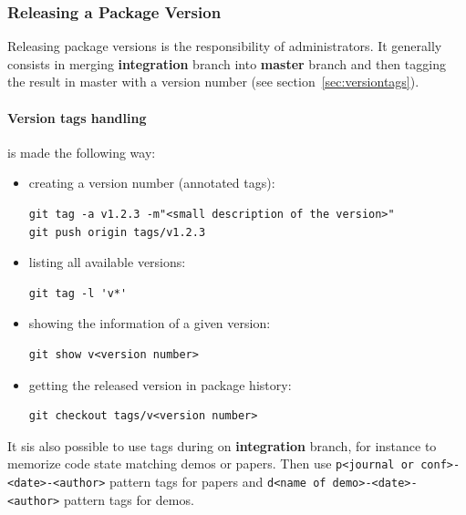 \documentclass[12pt,a4paper]{article}
\begin{document}
\subsubsection{Releasing a Package Version}

Releasing package versions is the responsibility of administrators. It generally consists in merging \textbf{integration} branch into \textbf{master} branch and then tagging the result in master with a version number (see section~\ref{sec:versiontags}). 

\paragraph{Version tags handling} is made the following way:
\begin{itemize}
\item creating a version number (annotated tags):
\begin{verbatim}
git tag -a v1.2.3 -m"<small description of the version>"
git push origin tags/v1.2.3
\end{verbatim}
\item listing all available versions:
\begin{verbatim}
git tag -l 'v*'
\end{verbatim} 
\item showing the information of a given version: 
\begin{verbatim}
git show v<version number>
\end{verbatim} 
\item getting the released version in package history:
\begin{verbatim}
git checkout tags/v<version number>
\end{verbatim} 
\end{itemize}
It sis also possible to use tags during on \textbf{integration} branch, for instance to memorize code state matching demos or papers. Then use \texttt{p<journal or conf>-<date>-<author>} pattern tags for papers and \texttt{d<name of demo>-<date>-<author>} pattern tags for demos.
\end{document}
